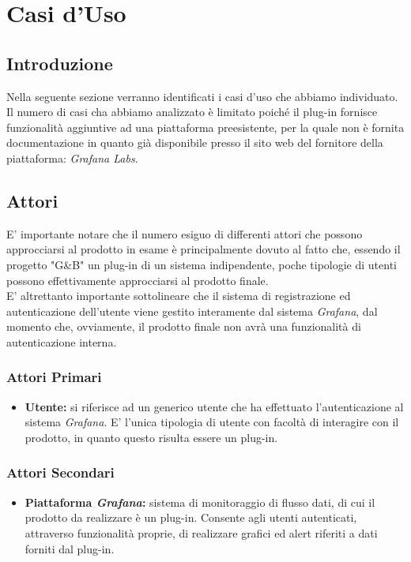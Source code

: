 \section{Casi d'Uso}\label{CasiUso}
\subsection{Introduzione}\label{CasiUso_Introduzione}
Nella seguente sezione verranno identificati i casi d'uso che abbiamo individuato.\\
Il numero di casi cha abbiamo analizzato è limitato poiché il plug-in fornisce funzionalità aggiuntive ad una piattaforma preesistente, per la quale non è fornita documentazione in quanto già disponibile presso il sito web del fornitore della piattaforma: \textit{Grafana Labs}.

\subsection{Attori}\label{Attori}
E' importante notare che il numero esiguo di differenti attori che possono approcciarsi al prodotto in esame è principalmente dovuto al fatto che, essendo il progetto "G\&B" un plug-in di un sistema indipendente, poche tipologie di utenti possono effettivamente approcciarsi al prodotto finale.\\
E' altrettanto importante sottolineare che il sistema di registrazione ed autenticazione dell'utente viene gestito interamente dal sistema \textit{Grafana}, dal momento che, ovviamente, il prodotto finale non avrà una funzionalità di autenticazione interna.

\subsubsection*{Attori Primari}
\begin{itemize}
\item \textbf{Utente:} si riferisce ad un generico utente che ha effettuato l'autenticazione al sistema \textit{Grafana}. E' l'unica tipologia di utente con facoltà di interagire con il prodotto, in quanto questo risulta essere un plug-in.
\end{itemize}

\subsubsection*{Attori Secondari}
\begin{itemize}
\item \textbf{Piattaforma \textit{Grafana}:} sistema di monitoraggio di flusso dati, di cui il prodotto da realizzare è un plug-in. Consente agli utenti autenticati, attraverso funzionalità proprie, di realizzare grafici ed alert riferiti a dati forniti dal plug-in.
\end{itemize}

